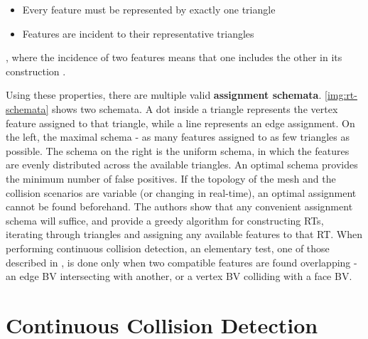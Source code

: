 \begin{itemize}
	\item Every feature must be represented by exactly one triangle
	\item Features are incident to their representative triangles
\end{itemize}

, where the incidence of two features means that one includes the other in its construction \citep{curtis2008}. 


Using these properties, there are multiple valid \textbf{assignment schemata}. \autoref{img:rt-schemata} shows two schemata. A dot inside a triangle represents the vertex feature assigned to that triangle, while a line represents an edge assignment. On the left, the maximal schema - as many features assigned to as few triangles as possible. The schema on the right is the uniform schema, in which the features are evenly distributed across the available triangles. An optimal schema provides the minimum number of false positives. If the topology of the mesh and the collision scenarios are variable (or changing in real-time), an optimal assignment cannot be found beforehand. The authors show that any convenient assignment schema will suffice, and provide a greedy algorithm for constructing RTs, iterating through triangles and assigning any available features to that RT. When performing continuous collision detection, an elementary test, one of those described in \citep{provot97}, is done only when two compatible features are found overlapping - an edge BV intersecting with another, or a vertex BV colliding with a face BV.


\FloatBarrier
\section{Continuous Collision Detection}
\label{sec:ccd}

